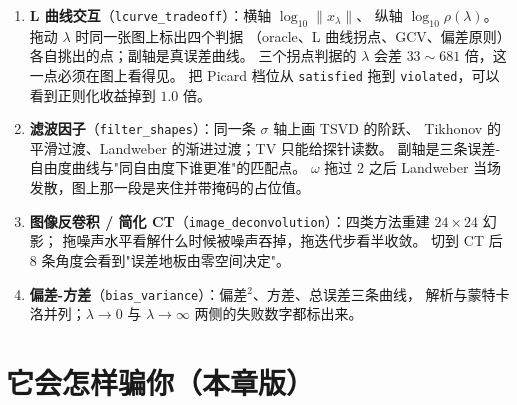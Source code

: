 \begin{enumerate}
  \item \textbf{L 曲线交互}（\texttt{lcurve\_tradeoff}）：横轴 $\log_{10}\lVert x_\lambda\rVert$、
        纵轴 $\log_{10}\rho(\lambda)$。拖动 $\lambda$ 时同一张图上标出四个判据
        （oracle、L 曲线拐点、GCV、偏差原则）各自挑出的点；副轴是真误差曲线。
        三个拐点判据的 $\lambda$ 会差 $33\sim681$ 倍，这一点必须在图上看得见。
        把 Picard 档位从 \texttt{satisfied} 拖到 \texttt{violated}，可以看到正则化收益掉到 $1.0$ 倍。
  \item \textbf{滤波因子}（\texttt{filter\_shapes}）：同一条 $\sigma$ 轴上画 TSVD 的阶跃、
        Tikhonov 的平滑过渡、Landweber 的渐进过渡；TV 只能给探针读数。
        副轴是三条误差-自由度曲线与"同自由度下谁更准"的匹配点。
        $\omega$ 拖过 $2$ 之后 Landweber 当场发散，图上那一段是夹住并带掩码的占位值。
  \item \textbf{图像反卷积 / 简化 CT}（\texttt{image\_deconvolution}）：四类方法重建 $24\times24$ 幻影；
        拖噪声水平看解什么时候被噪声吞掉，拖迭代步看半收敛。
        切到 CT 后 $8$ 条角度会看到"误差地板由零空间决定"。
  \item \textbf{偏差-方差}（\texttt{bias\_variance}）：偏差$^2$、方差、总误差三条曲线，
        解析与蒙特卡洛并列；$\lambda\to0$ 与 $\lambda\to\infty$ 两侧的失败数字都标出来。
\end{enumerate}



\section{它会怎样骗你（本章版）}

